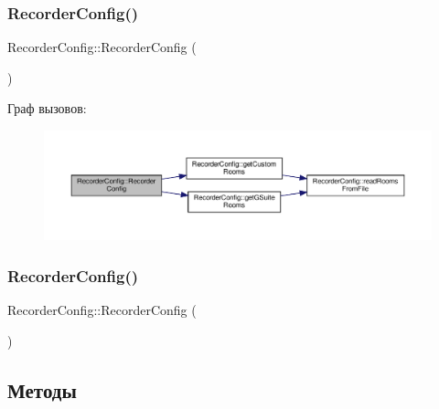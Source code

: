 \subsubsection{\texorpdfstring{Recorder\+Config()}{RecorderConfig()}\hspace{0.1cm}{\footnotesize\ttfamily [1/2]}}
{\footnotesize\ttfamily Recorder\+Config\+::\+Recorder\+Config (\begin{DoxyParamCaption}{ }\end{DoxyParamCaption})\hspace{0.3cm}{\ttfamily [private]}}

Граф вызовов\+:\nopagebreak
\begin{figure}[H]
\begin{center}
\leavevmode
\includegraphics[width=350pt]{class_recorder_config_a39ca563c2ac944a725b6d627ff364ab9_cgraph}
\end{center}
\end{figure}
\mbox{\label{class_recorder_config_a8393f87b954754d668f43957399999e5}} 
\subsubsection{\texorpdfstring{Recorder\+Config()}{RecorderConfig()}\hspace{0.1cm}{\footnotesize\ttfamily [2/2]}}
{\footnotesize\ttfamily Recorder\+Config\+::\+Recorder\+Config (\begin{DoxyParamCaption}\item[{const \hyperlink{class_recorder_config}{Recorder\+Config} \&}]{ }\end{DoxyParamCaption})\hspace{0.3cm}{\ttfamily [private]}}



\subsection{Методы}
\mbox{\label{class_recorder_config_a479f393f92d02955bd5c429c7723c79c}} 
